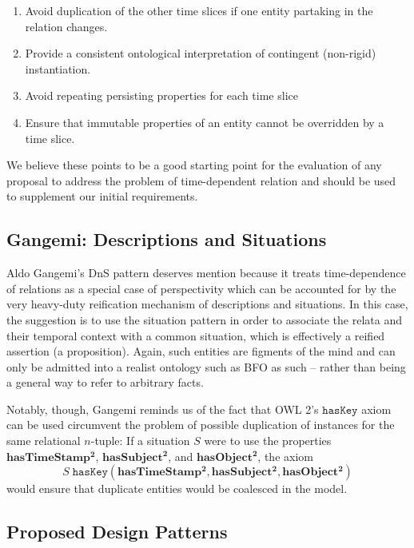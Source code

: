 \documentclass[10pt]{bmc_article}
\newcommand{\mirel}[1]{\ensuremath{\mathrm{\mathbf{#1}}}}
\newcommand{\mclass}[1]{\ensuremath{\mathit{#1}}}
\newcommand{\mrel}[2]{\mirel{#1^#2}}
\newcommand{\mrelb}[1]{\mrel{#1}{2}}
\newenvironment{bmcformat}{\baselineskip20pt\sloppy\setboolean{publ}{false}}{\baselineskip20pt\sloppy}
\begin{document}
\begin{bmcformat}
\begin{enumerate}
\item Avoid duplication of the other time slices if one entity partaking in the
relation changes.
\item Provide a consistent ontological interpretation of contingent (non-rigid)
instantiation.
\item Avoid repeating persisting properties for each time slice
\item Ensure that immutable properties of an entity cannot be overridden by a
time slice.
\end{enumerate}

We believe these points to be a good starting point for the evaluation of
any proposal to address the problem of time-dependent relation and should be
used to supplement our initial requirements.

\subsection*{Gangemi: Descriptions and Situations}
Aldo Gangemi's DnS pattern \cite{Gangemi:DnS} deserves mention because it treats
time-dependence of relations as a special case of perspectivity which can be
accounted for by the very heavy-duty reification mechanism of descriptions and
situations. In this case, the suggestion is to use the situation pattern in
order to associate the relata and their temporal context with a common
situation, which is effectively a reified assertion (a proposition). Again, such
entities are figments of the mind and can only be admitted into a realist
ontology such as BFO as such -- rather than being a general way to refer to
arbitrary facts. 

Notably, though, Gangemi reminds us of the fact that OWL 2's $\mathtt{hasKey}$
axiom can be used circumvent the problem of possible duplication of instances
for the same relational $n$-tuple: If a situation $\mclass{S}$ were to use the properties
$\mrelb{hasTimeStamp}$, $\mrelb{hasSubject}$, and $\mrelb{hasObject}$, the axiom
\begin{equation}
\mclass{S}\;\mathtt{hasKey}(\mrelb{hasTimeStamp}, \mrelb{hasSubject},
\mrelb{hasObject})
\end{equation}
would ensure that duplicate entities would be coalesced in the model.


\subsection*{Proposed Design Patterns}


\end{bmcformat}
\end{document}
